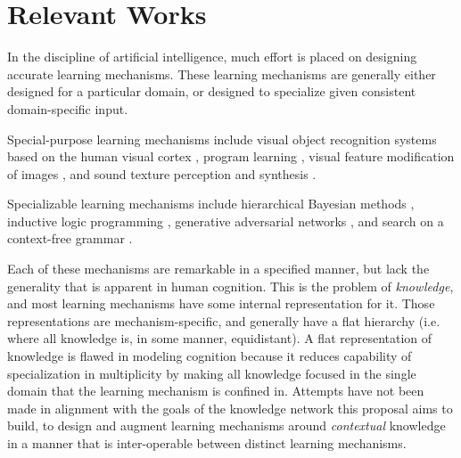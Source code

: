 \documentclass[11pt,letterpaper]{article}
\begin{document}
\section{Relevant Works}

In the discipline of artificial intelligence, much effort is placed on
designing accurate learning mechanisms.
These learning mechanisms are generally either designed for a particular
domain, or
designed to specialize given consistent domain-specific input.

Special-purpose learning mechanisms include visual object recognition
systems based on the human visual cortex \cite{serre07}, program learning
\cite{liang10}, visual feature modification of images \cite{kulkarni15}, and
sound texture perception and synthesis \cite{mcdermott11}.

Specializable learning mechanisms include hierarchical Bayesian methods
\cite{tenenbaum01}, inductive logic programming \cite{lavrac94}, generative
adversarial networks \cite{goodfellow14}, and search on a context-free
grammar \cite{piantadosi12}.

Each of these mechanisms are remarkable in a specified manner, but lack the
generality that is apparent in human cognition. This is the problem of
\emph{knowledge}, and most learning mechanisms have some internal
representation for it. Those representations are mechanism-specific, and
generally have a flat hierarchy (i.e. where all knowledge is, in some
manner, equidistant). A flat representation of knowledge is flawed in
modeling cognition because it reduces capability of specialization in
multiplicity by making all knowledge focused in the single domain that the
learning mechanism is confined in. Attempts have not been made in alignment
with the goals of the knowledge network this proposal aims to build, to
design and augment learning mechanisms around \emph{contextual} knowledge in
a manner that is inter-operable between distinct learning mechanisms.
\end{document}
